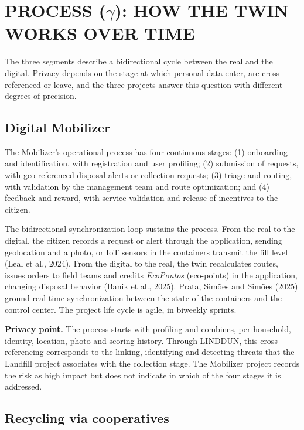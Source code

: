 \documentclass[12pt,a4paper,article,oneside,brazil,english]{abntex2}
\begin{document}
\section{PROCESS (\texorpdfstring{$\gamma$}{gamma}): HOW THE TWIN WORKS OVER TIME}

The three segments describe a bidirectional cycle between the real and the digital. Privacy depends on the stage at which personal data enter, are cross-referenced or leave, and the three projects answer this question with different degrees of precision.

\subsection{Digital Mobilizer}

The Mobilizer's operational process has four continuous stages: (1) onboarding and identification, with registration and user profiling; (2) submission of requests, with geo-referenced disposal alerts or collection requests; (3) triage and routing, with validation by the management team and route optimization; and (4) feedback and reward, with service validation and release of incentives to the citizen.

The bidirectional synchronization loop sustains the process. From the real to the digital, the citizen records a request or alert through the application, sending geolocation and a photo, or IoT sensors in the containers transmit the fill level (Leal et al., 2024). From the digital to the real, the twin recalculates routes, issues orders to field teams and credits \textit{EcoPontos} (eco-points) in the application, changing disposal behavior (Banik et al., 2025). Prata, Simões and Simões (2025) ground real-time synchronization between the state of the containers and the control center. The project life cycle is agile, in biweekly sprints.

\textbf{Privacy point.} The process starts with profiling and combines, per household, identity, location, photo and scoring history. Through LINDDUN, this cross-referencing corresponds to the linking, identifying and detecting threats that the Landfill project associates with the collection stage. The Mobilizer project records the risk as high impact but does not indicate in which of the four stages it is addressed.

\subsection{Recycling via cooperatives}
\end{document}
